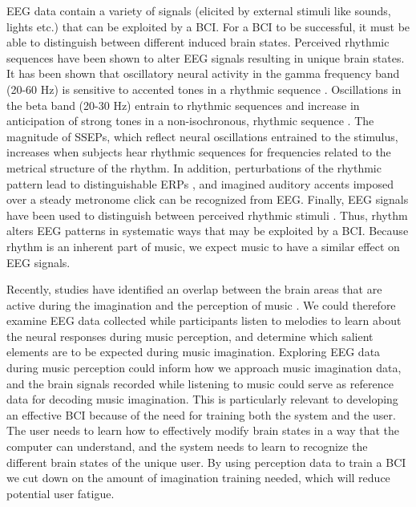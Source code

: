 EEG data contain a variety of signals (elicited by external stimuli like sounds, lights etc.) that can be exploited by a \ac{BCI}. 
For a \ac{BCI} to be successful, it must be able to distinguish between different induced brain states. 
Perceived rhythmic sequences have been shown to alter \ac{EEG} signals resulting in unique brain states.
It has been shown that oscillatory neural activity in the gamma frequency band (20-60 Hz) is sensitive to accented tones in a rhythmic sequence \cite{snyder_gamma-band_2005}.
Oscillations in the beta band (20-30 Hz) entrain to rhythmic sequences \cite{cirelli_beta_2014, merchant_beta_2015} and increase in anticipation of strong tones in a non-isochronous, rhythmic sequence \cite{iversen_top-down_2009,fujioka_beta_2009,fujioka_internalized_2012}.
The magnitude of \acp{SSEP}, which reflect neural oscillations entrained to the stimulus, increases when subjects hear rhythmic sequences for frequencies related to the metrical structure of the rhythm.
In addition, perturbations of the rhythmic pattern lead to distinguishable \acp{ERP} \cite{geiser_early_2009, vlek_shared_2011}, and imagined auditory accents imposed over a steady metronome click can be recognized from EEG.
Finally, \ac{EEG} signals have been used to distinguish between perceived rhythmic stimuli \cite{stober2014nips}.
Thus, rhythm alters \ac{EEG} patterns in systematic ways that may be exploited by a \ac{BCI}. 
Because rhythm is an inherent part of music, we expect music to have a similar effect on \ac{EEG} signals. 

Recently, studies have identified an overlap between the brain areas that are active during the imagination and the perception of music \cite{halpern_fmri_2004,Kraemer2005,Herholz2008,herholz_2012}. 
We could therefore examine \ac{EEG} data collected while participants listen to melodies to learn about the neural responses during music perception, and determine which salient elements are to be expected during music imagination.
Exploring EEG data during music perception could inform how we approach music imagination data, and the brain signals recorded while listening to music could serve as reference data for decoding music imagination. 
This is particularly relevant to developing an effective \ac{BCI} because of the need for training both the system and the user.
The user needs to learn how to effectively modify brain states in a way that the computer can understand, and the system needs to learn to recognize the different brain states of the unique user.
By using perception data to train a \ac{BCI} we cut down on the amount of imagination training needed, which will reduce potential user fatigue.


